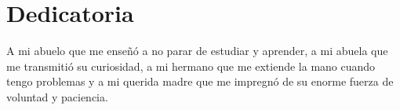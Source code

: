 \chapter{Dedicatoria}
A mi abuelo que me enseñó a no parar de
estudiar y aprender, a mi abuela que me
transmitió su curiosidad, a mi hermano que
me extiende la mano cuando tengo problemas y a 
mi querida madre que me impregnó de su enorme
fuerza de voluntad y paciencia.